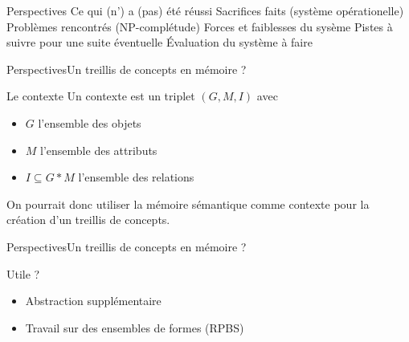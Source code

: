 \begin{frame}{Perspectives}
Ce qui (n') a (pas) été réussi
Sacrifices faits (système opérationelle)
Problèmes rencontrés (NP-complétude)
Forces et faiblesses du sysème
Pistes à suivre pour une suite éventuelle
Évaluation du système à faire
\end{frame}

\begin{frame}{Perspectives}{Un treillis de concepts en mémoire ?}
\begin{block}{Le contexte}
Un contexte est un triplet $(G,M,I)$ avec
\begin{itemize}
\item $G$ l'ensemble des objets
\item $M$ l'ensemble des attributs
\item $I \subseteq G*M$ l'ensemble des relations
\end{itemize}
On pourrait donc utiliser la mémoire sémantique comme contexte pour la création d'un treillis de concepts.
\end{block}
\end{frame}

\begin{frame}{Perspectives}{Un treillis de concepts en mémoire ?}
\begin{block}{Utile ?}
\begin{itemize}
\item Abstraction supplémentaire
\item Travail sur des ensembles de formes (RPBS)
\end{itemize}
\end{block}
\end{frame}

